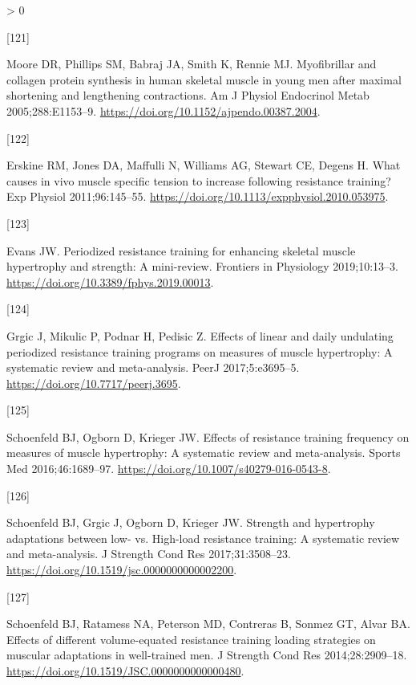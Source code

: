 \documentclass[twoside,10pt]{gihclass} %
\newlength{\cslhangindent}
\newlength{\csllabelwidth}
\newenvironment{CSLReferences}[3] %
 {%
  \setlength{\parindent}{0pt}
  \ifodd #1 \everypar{\setlength{\hangindent}{\cslhangindent}}\ignorespaces\fi
  \ifnum #2 > 0
  \setlength{\parskip}{#2\baselineskip}
  \fi
 }%
 {}
\newcommand{\CSLLeftMargin}[1]{\parbox[t]{\maxof{\widthof{#1}}{\csllabelwidth}}{#1}}
\newcommand{\CSLRightInline}[1]{\parbox[t]{\linewidth}{#1}}
\begin{document}
\begin{CSLReferences}{0}{0}
\leavevmode\hypertarget{ref-RN2457}{}%
\CSLLeftMargin{{[}121{]} }
\CSLRightInline{Moore DR, Phillips SM, Babraj JA, Smith K, Rennie MJ. Myofibrillar and collagen protein synthesis in human skeletal muscle in young men after maximal shortening and lengthening contractions. Am J Physiol Endocrinol Metab 2005;288:E1153--9. \url{https://doi.org/10.1152/ajpendo.00387.2004}.}

\leavevmode\hypertarget{ref-RN1504}{}%
\CSLLeftMargin{{[}122{]} }
\CSLRightInline{Erskine RM, Jones DA, Maffulli N, Williams AG, Stewart CE, Degens H. What causes in vivo muscle specific tension to increase following resistance training? Exp Physiol 2011;96:145--55. \url{https://doi.org/10.1113/expphysiol.2010.053975}.}

\leavevmode\hypertarget{ref-RN2575}{}%
\CSLLeftMargin{{[}123{]} }
\CSLRightInline{Evans JW. Periodized resistance training for enhancing skeletal muscle hypertrophy and strength: A mini-review. Frontiers in Physiology 2019;10:13--3. \url{https://doi.org/10.3389/fphys.2019.00013}.}

\leavevmode\hypertarget{ref-RN2572}{}%
\CSLLeftMargin{{[}124{]} }
\CSLRightInline{Grgic J, Mikulic P, Podnar H, Pedisic Z. Effects of linear and daily undulating periodized resistance training programs on measures of muscle hypertrophy: A systematic review and meta-analysis. PeerJ 2017;5:e3695--5. \url{https://doi.org/10.7717/peerj.3695}.}

\leavevmode\hypertarget{ref-RN2571}{}%
\CSLLeftMargin{{[}125{]} }
\CSLRightInline{Schoenfeld BJ, Ogborn D, Krieger JW. Effects of resistance training frequency on measures of muscle hypertrophy: A systematic review and meta-analysis. Sports Med 2016;46:1689--97. \url{https://doi.org/10.1007/s40279-016-0543-8}.}

\leavevmode\hypertarget{ref-RN2569}{}%
\CSLLeftMargin{{[}126{]} }
\CSLRightInline{Schoenfeld BJ, Grgic J, Ogborn D, Krieger JW. Strength and hypertrophy adaptations between low- vs. High-load resistance training: A systematic review and meta-analysis. J Strength Cond Res 2017;31:3508--23. \url{https://doi.org/10.1519/jsc.0000000000002200}.}

\leavevmode\hypertarget{ref-RN1612}{}%
\CSLLeftMargin{{[}127{]} }
\CSLRightInline{Schoenfeld BJ, Ratamess NA, Peterson MD, Contreras B, Sonmez GT, Alvar BA. Effects of different volume-equated resistance training loading strategies on muscular adaptations in well-trained men. J Strength Cond Res 2014;28:2909--18. \url{https://doi.org/10.1519/JSC.0000000000000480}.}


\end{CSLReferences}
\end{document}
